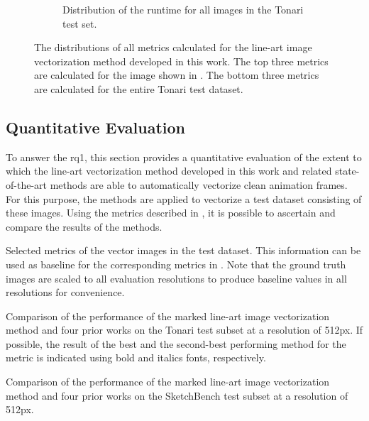 \begin{figure}[h]
\begin{subfigure}{.3\textwidth}
        \caption{Distribution of the runtime for all images in the Tonari test set.}
        \label{fig:example.metric.distributions.runtime}
    \end{subfigure}
    \caption{The distributions of all metrics calculated for the line-art image vectorization method developed in this work. The top three metrics are calculated for the image shown in . The bottom three metrics are calculated for the entire Tonari test dataset.}
    \label{fig:example.metric.distributions}
\end{figure}

\clearpage
\subsection{Quantitative Evaluation}
\label{subsec:eval.quant}
To answer the \gls{rq1}, this section provides a quantitative evaluation of the extent to which the line-art vectorization method developed in this work and related state-of-the-art methods are able to automatically vectorize clean animation frames. For this purpose, the methods are applied to vectorize a test dataset consisting of these images. Using the metrics described in , it is possible to ascertain and compare the results of the methods.

\begin{table}[]
    \centering
    
    \caption{Selected metrics of the vector images in the test dataset. This information can be used as baseline for the corresponding metrics in . Note that the ground truth images are scaled to all evaluation resolutions to produce baseline values in all resolutions for convenience.}
    \label{tab:gt_metrics}
\end{table}
    
\begin{table}[h]
    \centering
    
    \caption{Comparison of the performance of the marked line-art image vectorization method and four prior works on the Tonari test subset at a resolution of 512px. If possible, the result of the best and the second-best performing method for the metric is indicated using bold and italics fonts, respectively.}
    \label{tab:tonari-False-512-0.512}
\end{table}

\begin{table}[!h]
    \centering
    
    \caption{Comparison of the performance of the marked line-art image vectorization method and four prior works on the SketchBench test subset at a resolution of 512px.}
    \label{tab:sketchbench-False-512-0.512}
\end{table}

